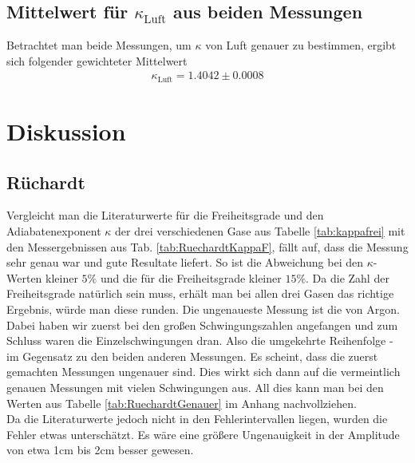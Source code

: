 \documentclass[12pt,a4paper,titlepage,headinclude,bibtotoc]{scrartcl}
\begin{document}
\subsection{Mittelwert für $\kappa_\text{Luft}$ aus beiden Messungen}
Betrachtet man beide Messungen, um $\kappa$ von Luft genauer zu bestimmen, ergibt sich folgender gewichteter Mittelwert
\begin{align}
	\kappa_\text{Luft}=1.4042 \pm 0.0008
\end{align}

\section{Diskussion}
\label{sec:diskussion}

\subsection{Rüchardt}
Vergleicht man die Literaturwerte für die Freiheitsgrade und den Adiabatenexponent $\kappa$ der drei verschiedenen Gase aus Tabelle \ref{tab:kappafrei} mit den Messergebnissen aus Tab. \ref{tab:RuechardtKappaF}, fällt auf, dass die Messung sehr genau war und gute Resultate liefert.
So ist die Abweichung bei den $\kappa$-Werten kleiner $5\%$ und die für die Freiheitsgrade kleiner $15\%$.
Da die Zahl der Freiheitsgrade natürlich sein muss, erhält man bei allen drei Gasen das richtige Ergebnis, würde man diese runden.
Die ungenaueste Messung ist die von Argon.
Dabei haben wir zuerst bei den großen Schwingungszahlen angefangen und zum Schluss waren die Einzelschwingungen dran.
Also die umgekehrte Reihenfolge - im Gegensatz zu den beiden anderen Messungen.
Es scheint, dass die zuerst gemachten Messungen ungenauer sind.
Dies wirkt sich dann auf die vermeintlich genauen Messungen mit vielen Schwingungen aus.
All dies kann man bei den Werten aus Tabelle \ref{tab:RuechardtGenauer} im Anhang nachvollziehen.\\
Da die Literaturwerte  jedoch nicht in den Fehlerintervallen liegen, wurden die Fehler etwas unterschätzt.
Es wäre eine größere Ungenauigkeit in der Amplitude von etwa 1cm bis 2cm besser gewesen.
\end{document}
